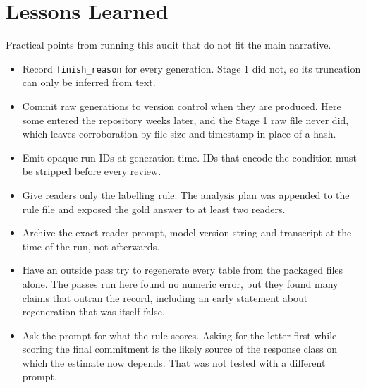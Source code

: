 \documentclass[10pt]{article}
\begin{document}
\section{Lessons Learned}\label{app:lessons}
Practical points from running this audit that do not fit the main narrative.
\begin{itemize}
  \item Record \texttt{finish\_reason} for every generation. Stage 1 did not, so its truncation can only be inferred from text.
  \item Commit raw generations to version control when they are produced. Here some entered the repository weeks later, and the Stage 1 raw file never did, which leaves corroboration by file size and timestamp in place of a hash.
  \item Emit opaque run IDs at generation time. IDs that encode the condition must be stripped before every review.
  \item Give readers only the labelling rule. The analysis plan was appended to the rule file and exposed the gold answer to at least two readers.
  \item Archive the exact reader prompt, model version string and transcript at the time of the run, not afterwards.
  \item Have an outside pass try to regenerate every table from the packaged files alone. The passes run here found no numeric error, but they found many claims that outran the record, including an early statement about regeneration that was itself false.
  \item Ask the prompt for what the rule scores. Asking for the letter first while scoring the final commitment is the likely source of the response class on which the estimate now depends. That was not tested with a different prompt.
\end{itemize}
\end{document}
